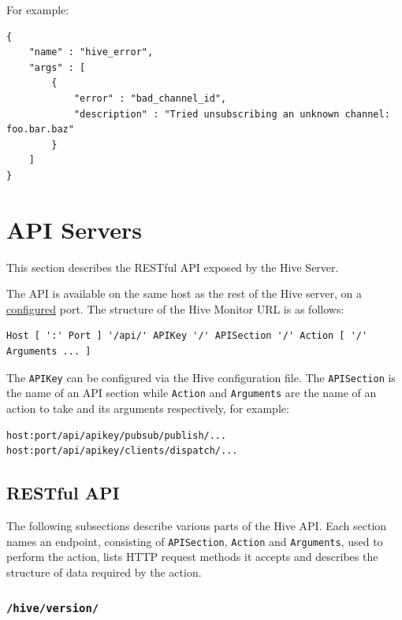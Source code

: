 \documentclass[a4paper]{article}
\begin{document}
\noindent
For example:


\begin{verbatim}
{
    "name" : "hive_error",
    "args" : [
        {
            "error" : "bad_channel_id",
            "description" : "Tried unsubscribing an unknown channel: foo.bar.baz"
        }
    ]
}
\end{verbatim}




\pagebreak
\section{API Servers}
\label{sec-6}
\label{ref-hive_api}

This section describes the RESTful API exposed by the Hive Server.

\noindent
The API is available on the same host as the rest of the Hive server, on a \hyperref[ref-api-config]{configured} port. The structure of the Hive Monitor URL is as follows:


\begin{verbatim}
Host [ ':' Port ] '/api/' APIKey '/' APISection '/' Action [ '/' Arguments ... ]
\end{verbatim}




\noindent
The \texttt{APIKey} can be configured via the Hive configuration file. The \texttt{APISection} is the name of an API section while \texttt{Action} and \texttt{Arguments} are the name of an action to take and its arguments respectively, for example:


\begin{verbatim}
host:port/api/apikey/pubsub/publish/...
host:port/api/apikey/clients/dispatch/...
\end{verbatim}
\subsection{RESTful API}
\label{sec-6-1}

The following subsections describe various parts of the Hive API. Each section names an endpoint, consisting of \texttt{APISection}, \texttt{Action} and \texttt{Arguments}, used to perform the action, lists HTTP request methods it accepts and describes the structure of data required by the action.
\subsubsection{\texttt{/hive/version/}}
\label{sec-6-1-1}
\end{document}
